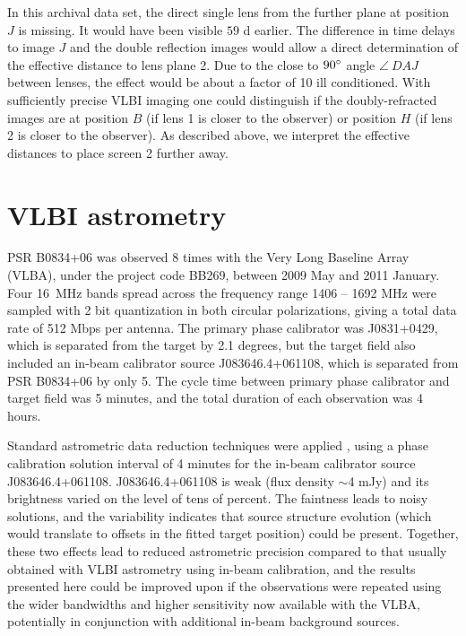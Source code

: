 \documentclass[useAMS,usenatbib]{mn2e}
\begin{document}

In this archival data set, the direct single lens from the further
plane at position $J$ is missing.  It would have been visible $59$ d
earlier. The difference in time delays to image $J$ and the double
reflection images would allow a direct determination of the effective
distance to lens plane 2.  Due to the close to $90 \degree$ angle $\angle~DAJ$
between lenses, the effect would be about a factor of 10 ill
conditioned.  With sufficiently precise VLBI imaging one could
distinguish if the doubly-refracted images are at position $B$ (if
lens 1 is closer to the observer) or position $H$ (if lens 2 is closer to the observer).  As described above, we interpret
the effective distances to place screen 2 further away.


\section{VLBI astrometry}
\label{sec:astrometry}

PSR B0834+06 was observed 8 times with the Very Long Baseline Array (VLBA), under the project code BB269, between 2009 May and 2011 January.  Four 16~MHz bands spread across the frequency range 1406 -- 1692 MHz were sampled with 2 bit quantization in both circular polarizations, giving a total data rate of 512 Mbps per antenna.  The primary phase calibrator was J0831+0429, which is separated from the target by 2.1 degrees, but the target field also included an in-beam calibrator source J083646.4+061108, which is separated from PSR B0834+06 by only 5\arcmin.  The cycle time between primary phase calibrator and target field was 5 minutes, and the total duration of each observation was 4 hours.

Standard astrometric data reduction techniques were applied
\citep[e.g.,][]{deller12b,deller13a}, using a phase calibration
solution interval of 4 minutes for the in-beam calibrator source
J083646.4+061108.  J083646.4+061108 is weak (flux density $\sim$4 mJy)
and its brightness varied on the level of tens of percent.  The
faintness leads to noisy solutions, and the variability indicates that
source structure evolution (which would translate to offsets in the
fitted target position) could be present.  Together, these two effects
lead to reduced astrometric precision compared to that usually
obtained with VLBI astrometry using in-beam calibration, and the
results presented here could be improved upon if the observations were
repeated using the wider bandwidths and higher sensitivity now
available with the VLBA, potentially in conjunction with additional
in-beam background sources.
\end{document}
